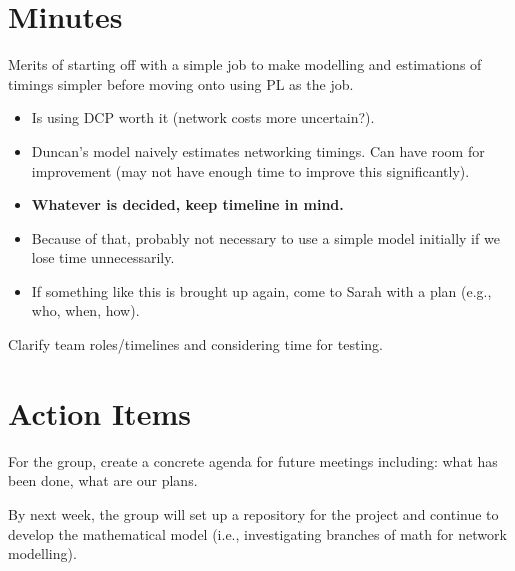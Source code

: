\documentclass[11pt]{meetingmins}
\begin{document}
    \maketitle

    \section{Minutes}
    \begin{items}
        \item Merits of starting off with a simple job to make modelling and estimations of timings simpler before moving onto using PL as the job.
        \begin{itemize}
            \item Is using DCP worth it (network costs more uncertain?).
            \item Duncan's model naively estimates networking timings. Can have room for improvement (may not have enough time to improve this significantly).
            \item \textbf{Whatever is decided, keep timeline in mind.}
            \item Because of that, probably not necessary to use a simple model initially if we lose time unnecessarily.
            \item If something like this is brought up again, come to Sarah with a plan (e.g., who, when, how).
        \end{itemize}
        \item Clarify team roles/timelines and considering time for testing.
    \end{items}

    \section{Action Items}
    \begin{items}
        \item For the group, create a concrete agenda for future meetings including: what has been done, what are our plans.
        \item By next week, the group will set up a repository for the project and continue to develop the mathematical model (i.e., investigating branches of math for network modelling).
    \end{items}

    \vspace{1em}

\end{document}

